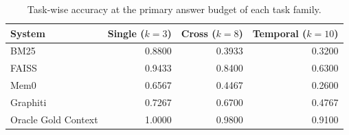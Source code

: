 \begin{table}[t]
\centering
\caption{Task-wise accuracy at the primary answer budget of each task family.}
\label{tab:task-maink}
\begin{tabular}{lrrr}
\toprule
System & Single ($k{=}3$) & Cross ($k{=}8$) & Temporal ($k{=}10$) \\
\midrule
BM25 & 0.8800 & 0.3933 & 0.3200 \\
FAISS & 0.9433 & 0.8400 & 0.6300 \\
Mem0 & 0.6567 & 0.4467 & 0.2600 \\
Graphiti & 0.7267 & 0.6700 & 0.4767 \\
Oracle Gold Context & 1.0000 & 0.9800 & 0.9100 \\
\bottomrule
\end{tabular}
\end{table}
